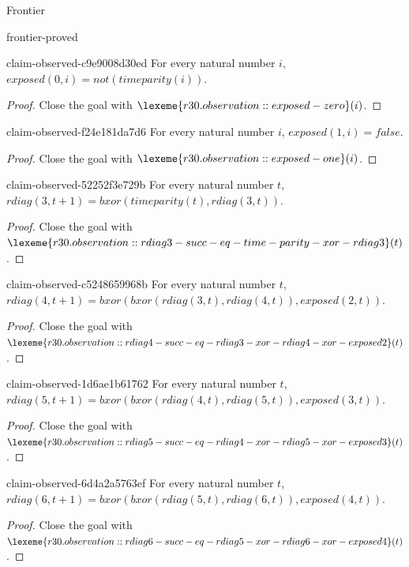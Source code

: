 \begin{lexlean}{Frontier}
\begin{section}{frontier-proved}
\begin{theorem}{claim-observed-c9e9008d30ed}
For every natural number \(i\), \(exposed(0, i) = not(timeparity(i))\).
\begin{proof}
Close the goal with \(\lexeme{r30.observation::exposed-zero}(i)\).
\end{proof}
\end{theorem}

\begin{theorem}{claim-observed-f24e181da7d6}
For every natural number \(i\), \(exposed(1, i) = false\).
\begin{proof}
Close the goal with \(\lexeme{r30.observation::exposed-one}(i)\).
\end{proof}
\end{theorem}

\begin{theorem}{claim-observed-52252f3e729b}
For every natural number \(t\), \(rdiag(3, t + 1) = bxor(timeparity(t), rdiag(3, t))\).
\begin{proof}
Close the goal with \(\lexeme{r30.observation::rdiag3-succ-eq-time-parity-xor-rdiag3}(t)\).
\end{proof}
\end{theorem}

\begin{theorem}{claim-observed-c5248659968b}
For every natural number \(t\), \(rdiag(4, t + 1) = bxor(bxor(rdiag(3, t), rdiag(4, t)), exposed(2, t))\).
\begin{proof}
Close the goal with \(\lexeme{r30.observation::rdiag4-succ-eq-rdiag3-xor-rdiag4-xor-exposed2}(t)\).
\end{proof}
\end{theorem}

\begin{theorem}{claim-observed-1d6ae1b61762}
For every natural number \(t\), \(rdiag(5, t + 1) = bxor(bxor(rdiag(4, t), rdiag(5, t)), exposed(3, t))\).
\begin{proof}
Close the goal with \(\lexeme{r30.observation::rdiag5-succ-eq-rdiag4-xor-rdiag5-xor-exposed3}(t)\).
\end{proof}
\end{theorem}

\begin{theorem}{claim-observed-6d4a2a5763ef}
For every natural number \(t\), \(rdiag(6, t + 1) = bxor(bxor(rdiag(5, t), rdiag(6, t)), exposed(4, t))\).
\begin{proof}
Close the goal with \(\lexeme{r30.observation::rdiag6-succ-eq-rdiag5-xor-rdiag6-xor-exposed4}(t)\).
\end{proof}
\end{theorem}


\end{section}
\end{lexlean}
